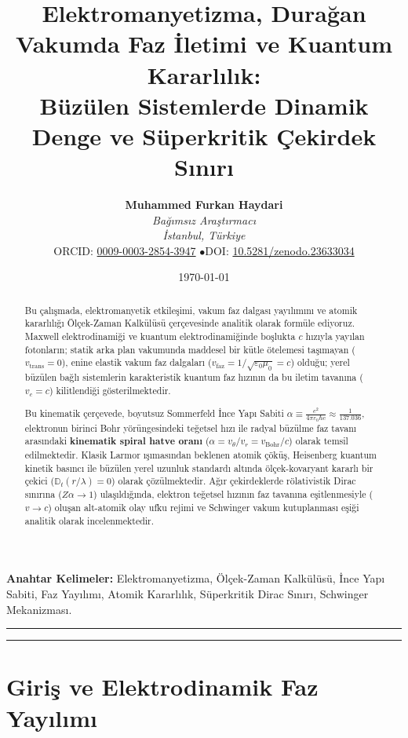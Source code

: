 \documentclass[11pt,a4paper]{article}
\title{\textbf{Elektromanyetizma, Durağan Vakumda Faz İletimi ve Kuantum Kararlılık: \\ Büzülen Sistemlerde Dinamik Denge ve Süperkritik Çekirdek Sınırı}}
\author{
    \textbf{Muhammed Furkan Haydari} \\
    \textit{Bağımsız Araştırmacı} \\
    \textit{İstanbul, Türkiye} \\
    \small ORCID: \href{https://orcid.org/0009-0003-2854-3947}{0009-0003-2854-3947} \quad$\bullet$\quad \small DOI: \href{https://doi.org/10.5281/zenodo.23633034}{10.5281/zenodo.23633034}
}
\date{\today}
\begin{document}
\maketitle

\begin{abstract}
    Bu çalışmada, elektromanyetik etkileşimi, vakum faz dalgası yayılımını ve atomik kararlılığı Ölçek-Zaman Kalkülüsü çerçevesinde analitik olarak formüle ediyoruz. Maxwell elektrodinamiği ve kuantum elektrodinamiğinde boşlukta $c$ hızıyla yayılan fotonların; statik arka plan vakumunda maddesel bir kütle ötelemesi taşımayan ($v_{\mathrm{trans}} = 0$), enine elastik vakum faz dalgaları ($v_{\mathrm{faz}} = 1/\sqrt{\varepsilon_0\mu_0} = c$) olduğu; yerel büzülen bağlı sistemlerin karakteristik kuantum faz hızının da bu iletim tavanına ($v_c = c$) kilitlendiği gösterilmektedir.

    Bu kinematik çerçevede, boyutsuz Sommerfeld İnce Yapı Sabiti $\alpha \equiv \frac{e^2}{4\pi\varepsilon_0\hbar c} \approx \frac{1}{137.036}$, elektronun birinci Bohr yörüngesindeki teğetsel hızı ile radyal büzülme faz tavanı arasındaki \textbf{kinematik spiral hatve oranı} ($\alpha = v_\theta / v_r = v_{\mathrm{Bohr}}/c$) olarak temsil edilmektedir. Klasik Larmor ışımasından beklenen atomik çöküş, Heisenberg kuantum kinetik basıncı ile büzülen yerel uzunluk standardı altında ölçek-kovaryant kararlı bir çekici ($\mathbb{D}_t(r/\lambda) = 0$) olarak çözülmektedir. Ağır çekirdeklerde rölativistik Dirac sınırına ($Z \alpha \to 1$) ulaşıldığında, elektron teğetsel hızının faz tavanına eşitlenmesiyle ($v \to c$) oluşan alt-atomik olay ufku rejimi ve Schwinger vakum kutuplanması eşiği analitik olarak incelenmektedir.
\end{abstract}

\vspace{1em}
\noindent\textbf{Anahtar Kelimeler:} Elektromanyetizma, Ölçek-Zaman Kalkülüsü, İnce Yapı Sabiti, Faz Yayılımı, Atomik Kararlılık, Süperkritik Dirac Sınırı, Schwinger Mekanizması.

\vspace{1em}
\hrule
\vspace{0.8em}
\tableofcontents
\vspace{0.8em}
\hrule
\vspace{1.5em}

\section{Giriş ve Elektrodinamik Faz Yayılımı}
\label{sec:giris}
\end{document}
